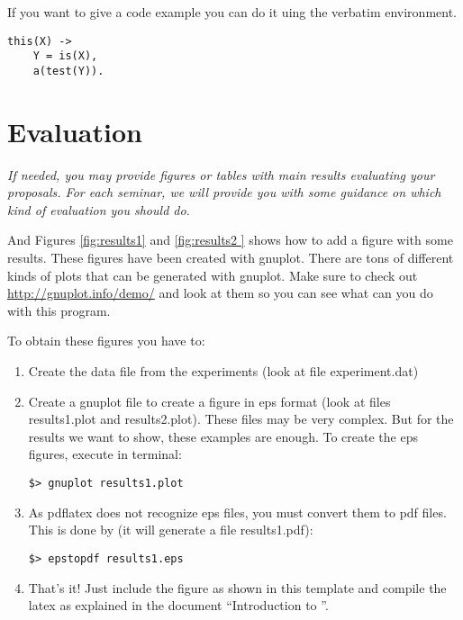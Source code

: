 \documentclass[a4paper, 11pt]{article}
\begin{document}
If you want to give a code example you can do it uing the verbatim environment.
\begin{verbatim}
this(X) ->
    Y = is(X),
    a(test(Y)).
\end{verbatim}

\section{Evaluation}

\textit{If needed, you may provide figures or tables with main results
  evaluating your proposals. For each seminar, we will provide you
  with some guidance on which kind of evaluation you should do.}


And Figures \ref{fig:results1} and \ref{fig:results2 } shows how to
add a figure with some results. These figures have been created with
gnuplot. There are tons of different kinds of plots that can be
generated with gnuplot. Make sure to check out
\url{http://gnuplot.info/demo/} and look at them so you can see what
can you do with this program.


To obtain these figures you have to:
\begin{enumerate}

\item Create the data file from the experiments (look at file
  experiment.dat)

\item Create a gnuplot file to create a figure in eps format (look at
  files results1.plot and results2.plot). These files may be very
  complex. But for the results we want to show, these examples are
  enough. To create the eps figures, execute in terminal:

\begin{verbatim}
$> gnuplot results1.plot 
\end{verbatim}

\item As pdflatex does not recognize eps files, you must convert them
  to pdf files. This is done by (it will generate a file
  results1.pdf):

\begin{verbatim}
$> epstopdf results1.eps
\end{verbatim}

\item That's it! Just include the figure as shown in this template and
  compile the latex as explained in the document ``Introduction to
  \LaTeXe''.

\end{enumerate}
\end{document}
